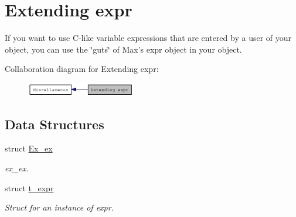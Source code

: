 \hypertarget{group__expr}{
\section{Extending expr}
\label{group__expr}
}


If you want to use C-\/like variable expressions that are entered by a user of your object, you can use the \char`\"{}guts\char`\"{} of Max’s expr object in your object.  


Collaboration diagram for Extending expr:\nopagebreak
\begin{figure}[H]
\begin{center}
\leavevmode
\includegraphics[width=135pt]{group__expr}
\end{center}
\end{figure}
\subsection*{Data Structures}
\begin{DoxyCompactItemize}
\item 
struct \hyperlink{structEx__ex}{Ex\_\-ex}
\begin{DoxyCompactList}\small\item\em ex\_\-ex. \item\end{DoxyCompactList}\item 
struct \hyperlink{structt__expr}{t\_\-expr}
\begin{DoxyCompactList}\small\item\em Struct for an instance of expr. \item\end{DoxyCompactList}\end{DoxyCompactItemize}
